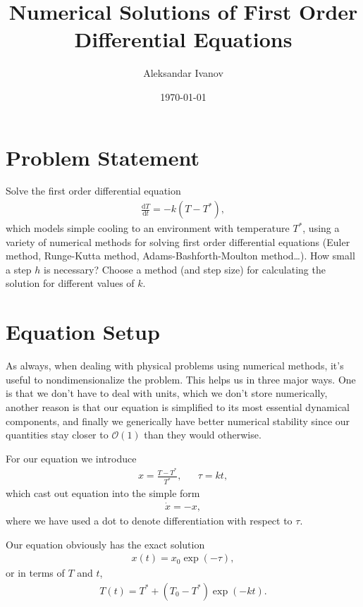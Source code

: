 \documentclass[10pt,a4paper,twocolumn]{article}
\begin{document}
\title{Numerical Solutions of First Order Differential Equations}
\author{Aleksandar Ivanov}
\date{\today}
\maketitle

\section{Problem Statement}

Solve the first order differential equation
%
\begin{align}
    \frac{\mathrm{d}T}{\mathrm{d}t} = - k (T - T^*),
\end{align}
%
which models simple cooling to an environment with temperature $T^*$, using a variety of numerical methods for solving first order differential equations (Euler method, Runge-Kutta method, Adams-Bashforth-Moulton method\dots). How small a step $h$ is necessary? Choose a method (and step size) for calculating the solution for different values of $k$.


\section{Equation Setup}

As always, when dealing with physical problems using numerical methods, it's useful to nondimensionalize the problem. This helps us in three major ways. One is that we don't have to deal with units, which we don't store numerically, another reason is that our equation is simplified to its most essential dynamical components, and finally we generically have better numerical stability since our quantities stay closer to $\mathcal{O}(1)$ than they would otherwise.

For our equation we introduce
%
\begin{align}
    x = \frac{T - T^*}{T^*},& &\tau = k t,
\end{align}
%
which cast out equation into the simple form
%
\begin{align}
    \dot{x} = - x,
\end{align}
%
where we have used a dot to denote differentiation with respect to $\tau$.

Our equation obviously has the exact solution
\begin{align}
    x(t) = x_0 \exp(- \tau),
\end{align}
%
or in terms of $T$ and $t$,
\begin{align}
    T(t) = T^* + (T_0 - T^*) \exp(-k t).
\end{align}
\end{document}
